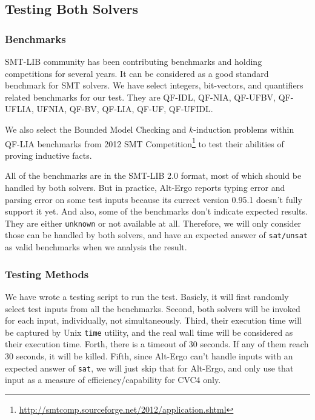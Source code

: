 \documentclass[10pt,twocolumn,letter]{article}
\theoremstyle{definition}
\begin{document}
\subsection{Testing Both Solvers}

\subsubsection{Benchmarks}

SMT-LIB community has been contributing benchmarks and holding competitions for several years\cite{bs2010}. It can be considered as a good standard benchmark for SMT solvers. We have select integers, bit-vectors, and quantifiers related benchmarks for our test. They are QF-IDL, QF-NIA, QF-UFBV, QF-UFLIA, UFNIA, QF-BV, QF-LIA, QF-UF, QF-UFIDL.

We also select the Bounded Model Checking and $k$-induction problems within QF-LIA benchmarks from 2012 SMT Competition\footnote{\url{http://smtcomp.sourceforge.net/2012/application.shtml}}\cite{cok20122012} 
to test their abilities of proving inductive facts.

All of the benchmarks are in the SMT-LIB 2.0 format, most of which should be handled by both solvers. But in practice, Alt-Ergo reports typing error and parsing error on some test inputs because its currect version 0.95.1 doesn't fully support it yet. And also, some of the benchmarks don't indicate expected results. They are either {\tt unknown} or not available at all. Therefore, we will only consider those can be handled by both solvers, and have an expected answer of {\tt sat/unsat} as valid benchmarks when we analysis the result.

\subsubsection{Testing Methods}

We have wrote a testing script to run the test. Basicly, it will first randomly select test inputs from all the benchmarks. Second, both solvers will be invoked for each input, individually, not simultaneously. Third, their execution time will be captured by Unix {\tt time} utility, and the real wall time will be considered as their execution time. Forth, there is a timeout of 30 seconds. If any of them reach 30 seconds, it will be killed. Fifth, since Alt-Ergo can't handle inputs with an expected answer of {\tt sat}, we will just skip that for Alt-Ergo, and only use that input as a measure of efficiency/capability for CVC4 only.
\end{document}
